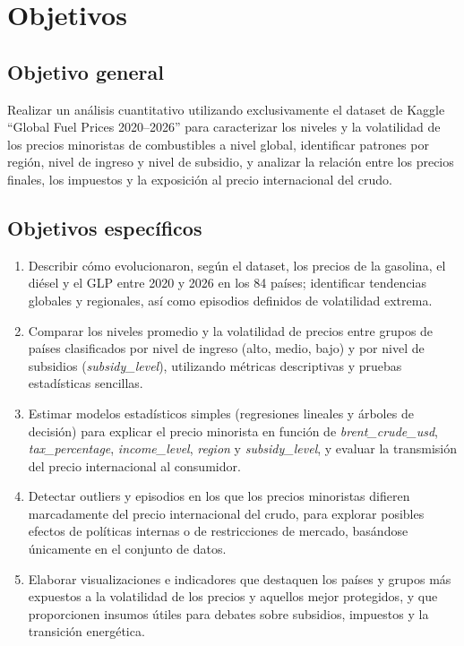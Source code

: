 \documentclass[stu, 12pt, a4paper, biblatex, donotrepeattitle]{apa7}
\begin{document}
\section{Objetivos}

\subsection{Objetivo general}

Realizar un análisis cuantitativo utilizando exclusivamente el dataset de Kaggle ``Global Fuel Prices 2020--2026'' para caracterizar los niveles y la volatilidad de los precios minoristas de combustibles a nivel global, identificar patrones por región, nivel de ingreso y nivel de subsidio, y analizar la relación entre los precios finales, los impuestos y la exposición al precio internacional del crudo.

\subsection{Objetivos específicos}

\begin{enumerate}
  \item Describir cómo evolucionaron, según el dataset, los precios de la gasolina, el diésel y el GLP entre 2020 y 2026 en los 84 países; identificar tendencias globales y regionales, así como episodios definidos de volatilidad extrema.

  \item Comparar los niveles promedio y la volatilidad de precios entre grupos de países clasificados por nivel de ingreso (alto, medio, bajo) y por nivel de subsidios (\textit{subsidy\_level}), utilizando métricas descriptivas y pruebas estadísticas sencillas.

  \item Estimar modelos estadísticos simples (regresiones lineales y árboles de decisión) para explicar el precio minorista en función de \textit{brent\_crude\_usd}, \textit{tax\_percentage}, \textit{income\_level}, \textit{region} y \textit{subsidy\_level}, y evaluar la transmisión del precio internacional al consumidor.

  \item Detectar outliers y episodios en los que los precios minoristas difieren marcadamente del precio internacional del crudo, para explorar posibles efectos de políticas internas o de restricciones de mercado, basándose únicamente en el conjunto de datos.

  \item Elaborar visualizaciones e indicadores que destaquen los países y grupos más expuestos a la volatilidad de los precios y aquellos mejor protegidos, y que proporcionen insumos útiles para debates sobre subsidios, impuestos y la transición energética.
\end{enumerate}
\end{document}
